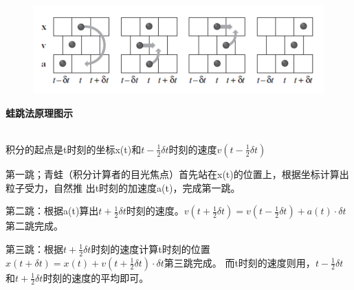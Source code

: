 \documentclass[12pt,a4paper]{ctexart}
\begin{document}
		\begin{figure}[h] %
		\centering %
		\includegraphics[height=8\baselineskip]{T52.PNG} %
	\end{figure}%
	
	\noindent\textbf{\qquad 蛙跳法原理图示}\\\
	
积分的起点是t时刻的坐标x(t)和$t-\frac{1}{2}\delta t$时刻的速度$v(t-\frac{1}{2}\delta t)$
 
第一跳；青蛙（积分计算者的目光焦点）首先站在x(t)的位置上，根据坐标计算出粒子受力，自然推 出t时刻的加速度a(t)，完成第一跳。 

第二跳：根据a(t)算出$t+\frac{1}{2}\delta t$时刻的速度。$v(t+\frac{1}{2}\delta t)= v(t-\frac{1}{2}\delta t)+a(t)\cdot \delta t$第二跳完成。 

第三跳：根据$t+\frac{1}{2}\delta t$时刻的速度计算t时刻的位置 $x(t+\delta t)=x(t)+v(t+\frac{1}{2}\delta t)\cdot \delta t$第三跳完成。
而t时刻的速度则用，$t-\frac{1}{2}\delta t$和$t+\frac{1}{2}\delta t$时刻的速度的平均即可。 
\end{document}
